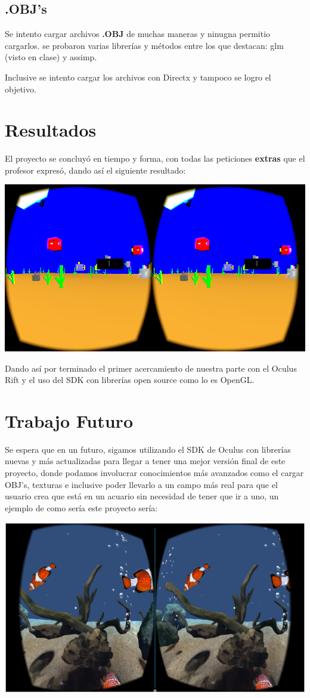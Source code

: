 \documentclass[10pt, a4paper, twocolumn]{article}
\begin{document}
\subsection{.OBJ's}
Se intento cargar archivos \textbf{.OBJ} de muchas maneras y ninugna permitio cargarlos. se probaron varias librerías y métodos entre los que destacan: glm (visto en clase) y assimp.

Inclusive se intento cargar los archivos con Directx y tampoco se logro el objetivo.

\section{Resultados}
El proyecto se concluyó en tiempo y forma, con todas las peticiones \textbf{extras} que el profesor expresó, dando así el siguiente resultado:

\includegraphics[width=\linewidth]{screen6.PNG}

Dando así por terminado el primer acercamiento de nuestra parte con el Oculus Rift y el uso del SDK con librerías open source como lo es OpenGL.

\section{Trabajo Futuro}
Se espera que en un futuro, sigamos utilizando el SDK de Oculus con librerías nuevas y más actualizadas para llegar a tener una mejor versión final de este proyecto, donde podamos involucrar conocimientos más avanzados como el cargar OBJ's, texturas e inclusive poder llevarlo a un campo más real para que el usuario crea que está en un acuario sin necesidad de tener que ir a uno, un ejemplo de como sería este proyecto sería:

\includegraphics[width=\linewidth]{peces.png}
\end{document}
